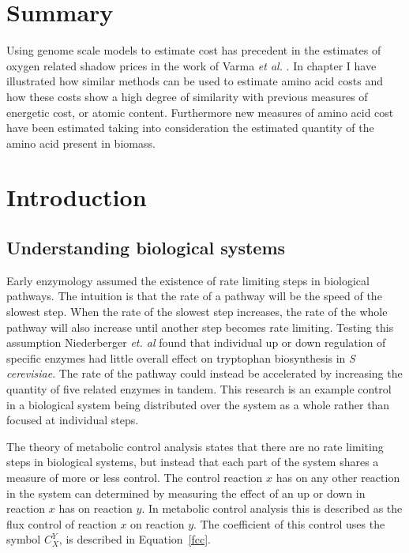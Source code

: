 \section*{Summary}

Using genome scale models to estimate cost has precedent in the estimates of oxygen related shadow prices in the work of Varma \emph{et al.} \cite{varma1993}. In chapter I have illustrated how similar methods can be used to estimate amino acid costs and how these costs show a high degree of similarity with previous measures of energetic cost, or atomic content. Furthermore new measures of amino acid cost have been estimated taking into consideration the estimated quantity of the amino acid present in biomass.

\clearpage

\section{Introduction}

\subsection{Understanding biological systems}

Early enzymology assumed the existence of rate limiting steps in biological pathways. The intuition is that the rate of a pathway will be the speed of the slowest step. When the rate of the slowest step increases, the rate of the whole pathway will also increase until another step becomes rate limiting. Testing this assumption Niederberger \emph{et. al} \cite{niederberger1992} found that individual up or down regulation of specific enzymes had little overall effect on tryptophan biosynthesis in \emph{S cerevisiae}. The rate of the pathway could instead be accelerated by increasing the quantity of five related enzymes in tandem. This research is an example control in a biological system being distributed over the system as a whole rather than focused at individual steps.

The theory of metabolic control analysis \cite{fell1992,fell1997} states that there are no rate limiting steps in biological systems, but instead that each part of the system shares a measure of more or less control. The control reaction $x$ has on any other reaction in the system can determined by measuring the effect of an up or down in reaction $x$ has on reaction $y$. In metabolic control analysis this is described as the flux control of reaction $x$ on reaction $y$. The coefficient of this control uses the symbol $C_{X}^{Y}$, is described in Equation~\vref{fcc}.

